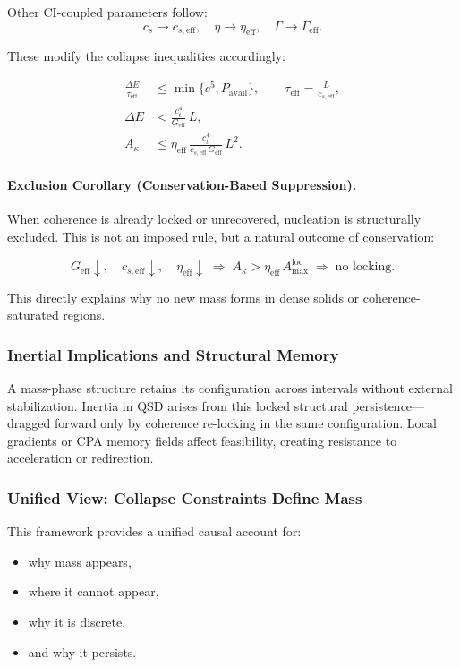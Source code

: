 \documentclass[preprints,article,submit,pdftex,moreauthors]{Definitions/mdpi}
\begin{document}
Other CI-coupled parameters follow:
\[
c_s \rightarrow c_{s,\mathrm{eff}}, \quad 
\eta \rightarrow \eta_{\mathrm{eff}}, \quad 
\Gamma \rightarrow \Gamma_{\mathrm{eff}}.
\]

These modify the collapse inequalities accordingly:

\begin{align}
\frac{\Delta E}{\tau_{\mathrm{eff}}} &\le \min\{c^5, P_{\mathrm{avail}}\}, \qquad 
\tau_{\mathrm{eff}} = \frac{L}{c_{s,\mathrm{eff}}}, \\[4pt]
\Delta E &< \frac{c_t^4}{G_{\mathrm{eff}}}\,L, \\[4pt]
A_\kappa &\le \eta_{\mathrm{eff}}\,\frac{c_t^4}{c_{s,\mathrm{eff}}\,G_{\mathrm{eff}}}\,L^2.
\end{align}

\paragraph{Exclusion Corollary (Conservation-Based Suppression).}

When coherence is already locked or unrecovered, nucleation is structurally excluded. This is not an imposed rule, but a natural outcome of conservation:

\[
G_{\mathrm{eff}} \downarrow, \quad c_{s,\mathrm{eff}} \downarrow, \quad \eta_{\mathrm{eff}} \downarrow 
\;\Rightarrow\; A_\kappa > \eta_{\mathrm{eff}}\,A_{\max}^{\mathrm{loc}} \;\Rightarrow\; \text{no locking}.
\]

This directly explains why no new mass forms in dense solids or coherence-saturated regions.

\subsubsection*{Inertial Implications and Structural Memory}

A mass-phase structure retains its configuration across intervals without external stabilization. Inertia in QSD arises from this locked structural persistence---dragged forward only by coherence re-locking in the same configuration. Local gradients or CPA memory fields affect feasibility, creating resistance to acceleration or redirection.

\subsubsection*{Unified View: Collapse Constraints Define Mass}

This framework provides a unified causal account for:
\begin{itemize}
    \item why mass appears,
    \item where it cannot appear,
    \item why it is discrete,
    \item and why it persists.
\end{itemize}
\end{document}
